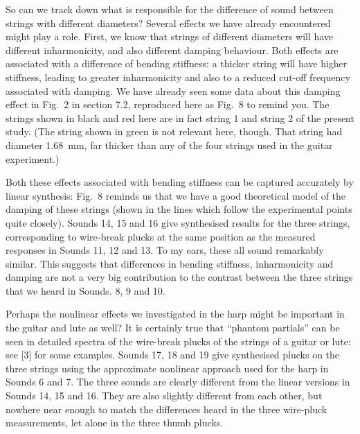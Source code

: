   So can we track down what is responsible for the difference of sound between 
  strings with different diameters? Several effects we have already encountered 
  might play a role. First, we know that strings of different diameters will 
  have different inharmonicity, and also different damping behaviour. Both 
  effects are associated with a difference of bending stiffness: a thicker 
  string will have higher stiffness, leading to greater inharmonicity and also 
  to a reduced cut-off frequency associated with damping. We have already seen 
  some data about this damping effect in Fig.\ 2 in section 7.2, reproduced 
  here as Fig.\ 8 to remind you. The strings shown in black and red here are in 
  fact string 1 and string 2 of the present study. (The string shown in green 
  is not relevant here, though. That string had diameter 1.68~mm, far thicker 
  than any of the four strings used in the guitar experiment.) 

  Both these effects associated with bending stiffness can be captured 
  accurately by linear synthesis: Fig.\ 8 reminds us that we have a good 
  theoretical model of the damping of these strings (shown in the lines which 
  follow the experimental points quite closely). Sounds 14, 15 and 16 give 
  synthesised results for the three strings, corresponding to wire-break plucks 
  at the same position as the measured responses in Sounds 11, 12 and 13. To my 
  ears, these all sound remarkably similar. This suggests that differences in 
  bending stiffness, inharmonicity and damping are not a very big contribution 
  to the contrast between the three strings that we heard in Sounds. 8, 9 and 
  10. 

  Perhaps the nonlinear effects we investigated in the harp might be important 
  in the guitar and lute as well? It is certainly true that “phantom partials” 
  can be seen in detailed spectra of the wire-break plucks of the strings of a 
  guitar or lute: see [3] for some examples. Sounds 17, 18 and 19 give 
  synthesised plucks on the three strings using the approximate nonlinear 
  approach used for the harp in Sounds 6 and 7. The three sounds are clearly 
  different from the linear versions in Sounds 14, 15 and 16. They are also 
  slightly different from each other, but nowhere near enough to match the 
  differences heard in the three wire-pluck measurements, let alone in the 
  three thumb plucks. 


